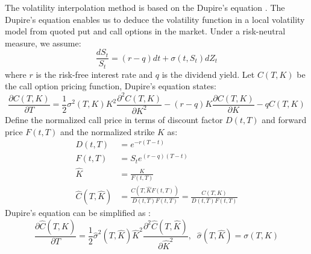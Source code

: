 \documentclass[letterpaper,12pt,titlepage,oneside,final]{book}
\numberwithin{equation}{section}
\theoremstyle{definition}
\begin{document}
The volatility interpolation method is based on the Dupire's equation \cite{dupire1994pricing}.  The Dupire's equation enables us to deduce the volatility function in a local volatility
model from quoted put and call options in the market.
Under a risk-neutral measure, we assume:
	\[
	\frac{d S_t}{ S_t}= \left(r-q\right)dt +\sigma(t,S_t) dZ_t
	\]
where $r$ is the risk-free interest rate and $q$ is the dividend yield.
 Let $C(T,K)$ be the call option pricing function, Dupire's equation states:
	\[
	\frac{\partial C(T,K)}{\partial T}=\frac{1}{2} {\sigma}^2(T,K)K^2  \frac{\partial^2 C(T,K)}{ \partial K^2}-(r-q) K\frac{\partial C(T,K)}{\partial K}-qC(T,K)
	\]
Define the normalized call price in terms of discount factor $D(t,T)$ and forward price $F(t,T)$ and the normalized strike $\widehat{K}$ as:
\[
\begin{split}
D(t,T)&=e^{-r(T-t)}\\
F(t,T)&=S_te^{(r-q)(T-t)}\\
\widehat{K}&=\frac{K}{F(t,T)}\\
\widehat{C}(T,\widehat{K})&=\frac{C(T,\widehat{K} F(t,T))}{D(t,T)F(t,T)}=\frac{C(T,K)}{D(t,T)F(t,T)}
\end{split}
\]
Dupire's equation can be simplified as \cite{andreasen2010volatility}:
\[
\frac{\partial \widehat{C}(T,\widehat{K})}{\partial T}=\frac{1}{2} \widehat{\sigma}^2(T,\widehat{K}) \widehat{K}^2  \frac{\partial^2 \widehat{C}(T,\widehat{K})}{ \partial \widehat{K}^2},\;\; \widehat{\sigma}(T,\widehat{K})={\sigma}(T,K)
\]
\end{document}
